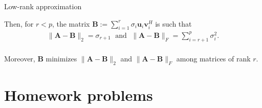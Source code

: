 \documentclass[t,usepdftitle=false]{beamer}
\begin{document}
\begin{frame}{Low-rank approximation}
\begin{itemize}
\begin{theorem}
Then, for $r<p$, the matrix $\mathbf{B}:=\sum_{i=1}^r\sigma_i\mathbf{u}_i\mathbf{v}_i^H$ is such that\vspace{-.6cm}
\begin{align*}
\|\mathbf{A}-\mathbf{B}\|_2=\sigma_{r+1}
\;\text{ and }\;
\|\mathbf{A}-\mathbf{B}\|_F=\sum_{i=r+1}^p\sigma_i^2.
\end{align*}
\vspace{-.4cm}\\
Moreover, $\mathbf{B}$ minimizes $\|\mathbf{A}-\mathbf{B}\|_2$ and $\|\mathbf{A}-\mathbf{B}\|_F$ among matrices of rank $r$.
\end{theorem}
\end{itemize}
\end{frame}

\section{Homework problems}
\end{document}
